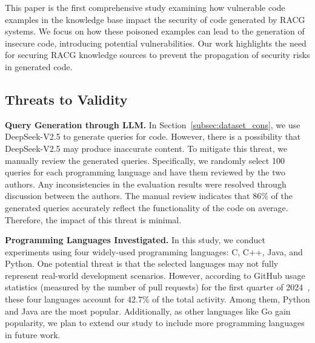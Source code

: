 This paper is the first comprehensive study examining how vulnerable code examples in the knowledge base impact the security of code generated by RACG systems. We focus on how these poisoned examples can lead to the generation of insecure code, introducing potential vulnerabilities. Our work highlights the need for securing RACG knowledge sources to prevent the propagation of security risks in generated code.

\subsection{Threats to Validity}

{\bf Query Generation through LLM.} In Section~\ref{subsec:dataset_cons}, we use DeepSeek-V2.5 to generate queries for code. However, there is a possibility that DeepSeek-V2.5 may produce inaccurate content. To mitigate this threat, we manually review the generated queries. Specifically, we randomly select 100 queries for each programming language and have them reviewed by the two authors. Any inconsistencies in the evaluation results were resolved through discussion between the authors. The manual review indicates that 86\% of the generated queries accurately reflect the functionality of the code on average. Therefore, the impact of this threat is minimal.

\noindent

{\bf Programming Languages Investigated.} In this study, we conduct experiments using four widely-used programming languages: C, C++, Java, and Python. One potential threat is that the selected languages may not fully represent real-world development scenarios. However, according to GitHub usage statistics (measured by the number of pull requests) for the first quarter of 2024~\cite{githut2024}, these four languages account for 42.7\% of the total activity. Among them, Python and Java are the most popular. Additionally, as other languages like Go gain popularity, we plan to extend our study to include more programming languages in future work.